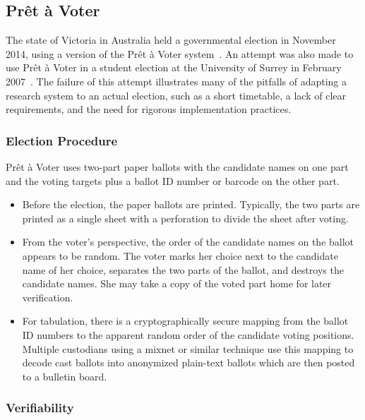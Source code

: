\subsection{Prêt à Voter~\cite{chaum2005}}
\label{sec:pret-voter}

The state of Victoria in Australia held a governmental election in
November 2014, using a version of the Prêt à Voter
system~\cite{burton2012}. An attempt was also made to use Prêt à Voter
in a student election at the University of Surrey in February
2007~\cite{bismark2007}. The failure of this attempt illustrates many
of the pitfalls of adapting a research system to an actual election,
such as a short timetable, a lack of clear requirements, and the need
for rigorous implementation practices.

\subsubsection{Election Procedure}

Prêt à Voter uses two-part paper ballots with the candidate names on
one part and the voting targets plus a ballot ID number or barcode on
the other part.

\begin{itemize}

\item Before the election, the paper ballots are printed. Typically,
  the two parts are printed as a single sheet with a perforation to
  divide the sheet after voting.

\item From the voter's perspective, the order of the candidate names
  on the ballot appears to be random. The voter marks her choice next
  to the candidate name of her choice, separates the two parts of the
  ballot, and destroys the candidate names. She may take a copy of the
  voted part home for later verification.

\item For tabulation, there is a cryptographically secure mapping from
  the ballot ID numbers to the apparent random order of the candidate
  voting positions. Multiple custodians using a mixnet or similar
  technique use this mapping to decode cast ballots into anonymized
  plain-text ballots which are then posted to a bulletin board.

\end{itemize}

\subsubsection{Verifiability}

